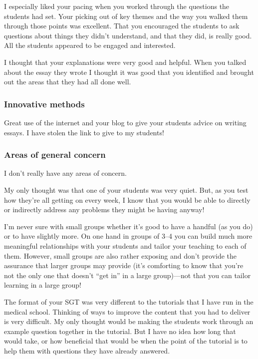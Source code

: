 I especially liked your pacing when you worked through the questions the students had set. Your picking out of key themes and the way you walked them through those points was excellent. That you encouraged the students to ask questions about things they didn't understand, and that they did, is really good. All the students appeared to be engaged and interested.

I thought that your explanations were very good and helpful. When you talked about the essay they wrote I thought it was good that you identified and brought out the areas that they had all done well. 

\subsubsection{Innovative methods}\label{sec:A-innovative}

Great use of the internet and your blog to give your students advice on writing essays. I have stolen the link to give to my students! 

\subsubsection{Areas of general concern}\label{sec:A-concern}

I don't really have any areas of concern.

My only thought was that one of your students was very quiet. But, as you test how they're all getting on every week, I know that you would be able to directly or indirectly address any problems they might be having anyway!

I'm never sure with small groups whether it's good to have a handful (as you do) or to have slightly more. On one hand in groups of 3--4 you can build much more meaningful relationships with your students and tailor your teaching to each of them. However, small groups are also rather exposing and don't provide the assurance that larger groups may provide (it's comforting to know that you're not the only one that doesn't ``get in'' in a large group)---not that you can tailor learning in a large group! 

The format of your SGT was very different to the tutorials that I have run in the medical school. Thinking of ways to improve the content that you had to deliver is very difficult. My only thought would be making the students work through an example question together in the tutorial. But I have no idea how long that would take, or how beneficial that would be when the point of the tutorial is to help them with questions they have already answered.

